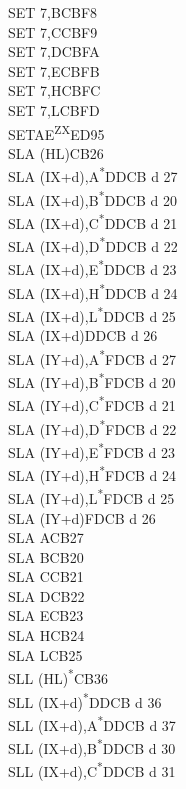 \documentclass[twoside,openright,a4paper]{book}
\begin{document}
\begin{multicols}{3}
{\begin{tabbing}
	SET 7,B\>CBF8\\
	SET 7,C\>CBF9\\
	SET 7,D\>CBFA\\
	SET 7,E\>CBFB\\
	SET 7,H\>CBFC\\
	SET 7,L\>CBFD\\
	SETAE\textsuperscript{ZX}\>ED95\\
	SLA (HL)\>CB26\\
	SLA (IX+d),A\textsuperscript{*}\>DDCB d 27\\
	SLA (IX+d),B\textsuperscript{*}\>DDCB d 20\\
	SLA (IX+d),C\textsuperscript{*}\>DDCB d 21\\
	SLA (IX+d),D\textsuperscript{*}\>DDCB d 22\\
	SLA (IX+d),E\textsuperscript{*}\>DDCB d 23\\
	SLA (IX+d),H\textsuperscript{*}\>DDCB d 24\\
	SLA (IX+d),L\textsuperscript{*}\>DDCB d 25\\
	SLA (IX+d)\>DDCB d 26\\
	SLA (IY+d),A\textsuperscript{*}\>FDCB d 27\\
	SLA (IY+d),B\textsuperscript{*}\>FDCB d 20\\
	SLA (IY+d),C\textsuperscript{*}\>FDCB d 21\\
	SLA (IY+d),D\textsuperscript{*}\>FDCB d 22\\
	SLA (IY+d),E\textsuperscript{*}\>FDCB d 23\\
	SLA (IY+d),H\textsuperscript{*}\>FDCB d 24\\
	SLA (IY+d),L\textsuperscript{*}\>FDCB d 25\\
	SLA (IY+d)\>FDCB d 26\\
	SLA A\>CB27\\
	SLA B\>CB20\\
	SLA C\>CB21\\
	SLA D\>CB22\\
	SLA E\>CB23\\
	SLA H\>CB24\\
	SLA L\>CB25\\
	SLL (HL)\textsuperscript{*}\>CB36\\
	SLL (IX+d)\textsuperscript{*}\>DDCB d 36\\
	SLL (IX+d),A\textsuperscript{*}\>DDCB d 37\\
	SLL (IX+d),B\textsuperscript{*}\>DDCB d 30\\
	SLL (IX+d),C\textsuperscript{*}\>DDCB d 31\\

\end{tabbing}}
\end{multicols}
\end{document}
